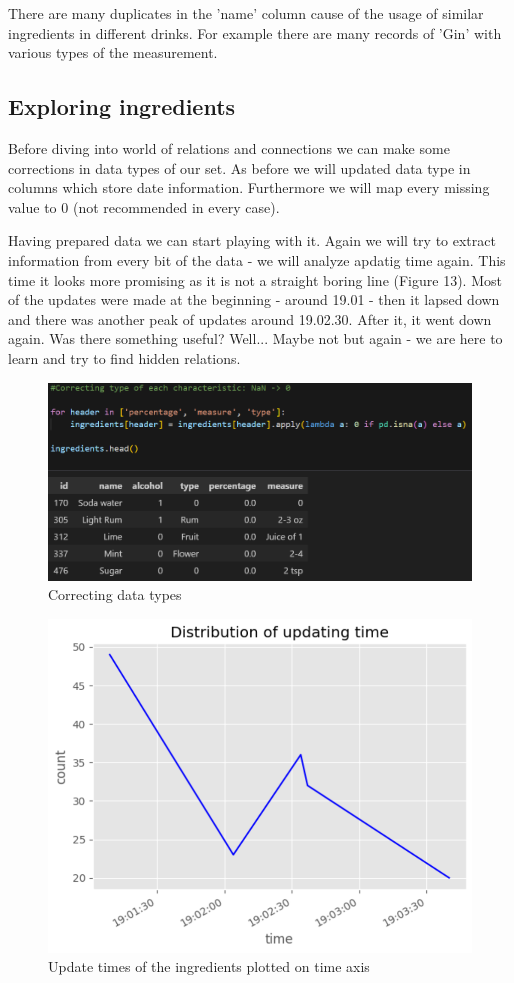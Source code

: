 \documentclass[a4paper]{article}
\begin{document}
There are many duplicates in the 'name' column cause of the usage of similar ingredients in different drinks. For example there are many records of 'Gin' with various types of the measurement.

\subsection{Exploring ingredients}
Before diving into world of relations and connections we can make some corrections in data types of our set. As before we will updated data type in columns which store date information. Furthermore we will map every missing value to 0 (not recommended in every case).

Having prepared data we can start playing with it. Again we will try to extract information from every bit of the data - we will analyze apdatig time again. This time it looks more promising as it is not a straight boring line (Figure 13). Most of the updates were made at the beginning - around 19.01 - then it lapsed down and there was another peak of updates around 19.02.30. After it, it went down again. Was there something useful? Well... Maybe not but again - we are here to learn and try to find hidden relations.

\begin{figure}[H]
    \centering
    \includegraphics[width=1\linewidth]{lambdaingr.png}
    \caption{Correcting data types}
    \label{fig:enter-label}
\end{figure}

\begin{figure}[H]
    \centering
    \includegraphics[width=0.75\linewidth]{updatetimes.png}
    \caption{Update times of the ingredients plotted on time axis}
    \label{fig:enter-label}
\end{figure}
\end{document}
